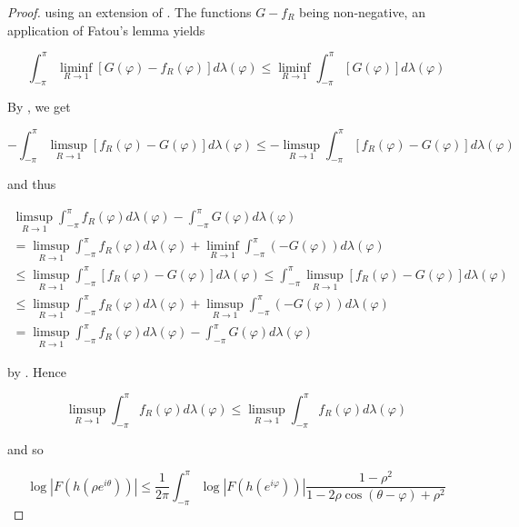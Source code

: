 \begin{proof}
using an extension of \cite[359]{bourbaki:general_topology:1995}. The functions $G - f_R$ being non-negative, an application of Fatou's lemma yields

\begin{equation*}
	\int_{-\pi}^\pi \liminf_{R \to 1}\left[ G(\varphi) - f_R(\varphi)\right]d\lambda(\varphi) \leqslant \liminf_{R \to 1} \int_{-\pi}^\pi \left[ G(\varphi)\right]d\lambda(\varphi)
\end{equation*}

By \cite[354]{bourbaki:general_topology:1995}, we get

\begin{equation*}
	-\int_{-\pi}^\pi \limsup_{R \to 1}\left[ f_R(\varphi) - G(\varphi)\right]d\lambda(\varphi) \leqslant -\limsup_{R \to 1} \int_{-\pi}^\pi \left[ f_R(\varphi) - G(\varphi)\right]d\lambda(\varphi)
\end{equation*}

and thus

\begin{multline*}
	\limsup_{R \to 1} \int_{-\pi}^\pi f_R(\varphi) d\lambda(\varphi) - \int_{-\pi}^\pi G(\varphi)d\lambda(\varphi)\\
	= \limsup_{R \to 1} \int_{-\pi}^\pi f_R(\varphi) d\lambda(\varphi) + \liminf_{R \to 1}\int_{-\pi}^\pi \left(-G(\varphi)\right)d\lambda(\varphi)\\
	\leqslant \limsup_{R \to 1}\int_{-\pi}^\pi \left[ f_R(\varphi) - G(\varphi)\right]d\lambda(\varphi)\leqslant \int_{-\pi}^\pi \limsup_{R \to 1} \left[f_R(\varphi) - G(\varphi)\right]d\lambda(\varphi)\\
	\leqslant \limsup_{R \to 1} \int_{-\pi}^\pi f_R(\varphi) d\lambda(\varphi) + \limsup_{R \to 1}\int_{-\pi}^\pi \left(-G(\varphi)\right)d\lambda(\varphi)\\
	= \limsup_{R \to 1} \int_{-\pi}^\pi f_R(\varphi) d\lambda(\varphi) - \int_{-\pi}^\pi G(\varphi)d\lambda(\varphi)
\end{multline*}

by \cite[358]{bourbaki:general_topology:1995}. Hence

\begin{equation*}
	\limsup_{R \to 1} \int_{-\pi}^\pi f_R(\varphi) d\lambda(\varphi) \leqslant\limsup_{R \to 1} \int_{-\pi}^\pi f_R(\varphi) d\lambda(\varphi)
\end{equation*}

and so 

\begin{equation}
	\log\left| F( h( \rho e^{i\theta} ) )\right| \leqslant \frac{1}{2\pi} \int_{-\pi}^\pi \log\left| F( h( e^{i\varphi}))\right| \frac{1 - \rho^2}{1 - 2\rho\cos\left( \theta - \varphi \right) + \rho^2}	
	\label{eq:limit_case}
\end{equation}


\end{proof}

